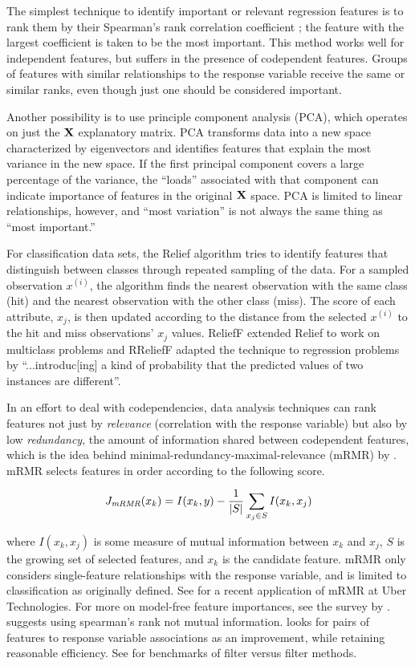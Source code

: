 \documentclass[11pt]{article}
\renewcommand{\xi}{x^{(i)}}
\begin{document}
The simplest technique to identify important or relevant regression features is to rank them by their Spearman's rank correlation coefficient \citep{spearmans}; the feature with the largest coefficient is taken to be the most important. This method works well for independent features, but suffers in the presence of codependent features.   Groups of features with similar relationships to the response variable receive the same or similar ranks, even though just one should be considered important.

Another possibility is to use principle component analysis (PCA), which operates on just the $\bf X$ explanatory matrix. PCA transforms data into a new space characterized by eigenvectors and identifies features that explain the most variance in the new space. If the first principal component covers a large percentage of the variance, the ``loads'' associated with that component can indicate importance of features in the original $\bf X$ space. PCA is limited to linear relationships, however, and ``most variation'' is not always the same thing as ``most important.''

For classification data sets, the Relief algorithm \citep{relief} tries to identify features that distinguish between classes through repeated sampling of the data. For a sampled observation $\xi$, the algorithm finds the nearest observation with the same class (hit) and the nearest observation with the other class (miss). The score of each attribute, $x_j$, is then updated according to the distance from the selected $\xi$ to the hit and miss observations'  $x_j$ values. ReliefF \citep{ReliefF} extended Relief to work on multiclass problems and RReliefF \citep{RReliefF} adapted the technique to regression problems by ``...introduc[ing] a kind of probability that the predicted values of two instances are different''.

In an effort to deal with codependencies, data analysis techniques can rank features not just by {\em relevance} (correlation with the response variable) but also by low {\em redundancy}, the amount of information shared between codependent features, which is the idea behind minimal-redundancy-maximal-relevance (mRMR) by \citet{mRMR}. mRMR selects features in order according to the following score.

\[
J_{\text{\it mRMR}}(x_k) = I(x_k, y) - \frac{1}{|S|} \sum_{x_j \in S} I(x_k, x_j)
\]

\noindent where $I(x_k, x_j)$ is some measure of mutual information between $x_k$ and $x_j$, $S$ is the growing set of selected features, and $x_k$ is the candidate feature. mRMR only considers single-feature relationships with the response variable, and is limited to classification as originally defined. See \cite{ubermRMR} for a recent application of mRMR at Uber Technologies.  For more on model-free feature importances, see the survey by \cite{survey}.  \citet{tsanas} suggests using spearman's rank not mutual information. \citet{meyer-microarray} looks for pairs of features to response variable associations as an improvement, while retaining reasonable efficiency. See \citet{filter-benchmark} for benchmarks of filter versus filter methods.
\end{document}

